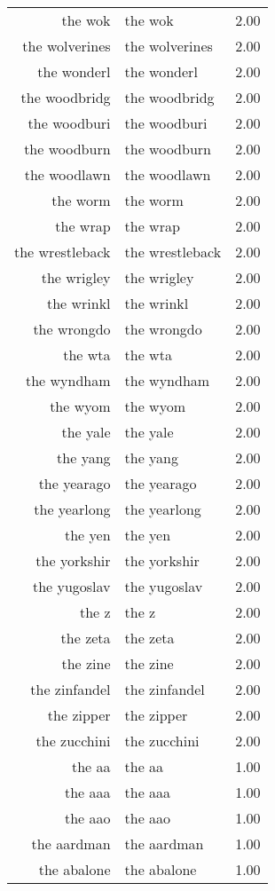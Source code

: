 \begin{table}[ht]
\begin{tabular}{rlr}
  the wok & the wok & 2.00 \\ 
  the wolverines & the wolverines & 2.00 \\ 
  the wonderl & the wonderl & 2.00 \\ 
  the woodbridg & the woodbridg & 2.00 \\ 
  the woodburi & the woodburi & 2.00 \\ 
  the woodburn & the woodburn & 2.00 \\ 
  the woodlawn & the woodlawn & 2.00 \\ 
  the worm & the worm & 2.00 \\ 
  the wrap & the wrap & 2.00 \\ 
  the wrestleback & the wrestleback & 2.00 \\ 
  the wrigley & the wrigley & 2.00 \\ 
  the wrinkl & the wrinkl & 2.00 \\ 
  the wrongdo & the wrongdo & 2.00 \\ 
  the wta & the wta & 2.00 \\ 
  the wyndham & the wyndham & 2.00 \\ 
  the wyom & the wyom & 2.00 \\ 
  the yale & the yale & 2.00 \\ 
  the yang & the yang & 2.00 \\ 
  the yearago & the yearago & 2.00 \\ 
  the yearlong & the yearlong & 2.00 \\ 
  the yen & the yen & 2.00 \\ 
  the yorkshir & the yorkshir & 2.00 \\ 
  the yugoslav & the yugoslav & 2.00 \\ 
  the z & the z & 2.00 \\ 
  the zeta & the zeta & 2.00 \\ 
  the zine & the zine & 2.00 \\ 
  the zinfandel & the zinfandel & 2.00 \\ 
  the zipper & the zipper & 2.00 \\ 
  the zucchini & the zucchini & 2.00 \\ 
  the aa & the aa & 1.00 \\ 
  the aaa & the aaa & 1.00 \\ 
  the aao & the aao & 1.00 \\ 
  the aardman & the aardman & 1.00 \\ 
  the abalone & the abalone & 1.00 \\ 

\end{tabular}
\end{table}
